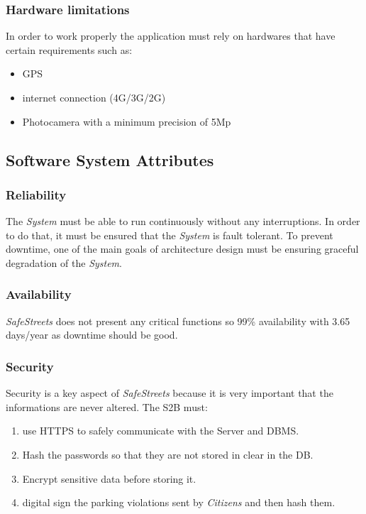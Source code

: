 \documentclass{article}
\begin{document}
\subsubsection{Hardware limitations}
In order to work properly the application must rely on hardwares that have certain requirements 
such as:
\begin{itemize}
    \item GPS
    \item internet connection (4G/3G/2G)
    \item Photocamera with a minimum precision of 5Mp 
\end{itemize}   

\subsection{Software System Attributes}

\subsubsection{Reliability}
The \textit{System} must be able to run continuously without any interruptions. In order to do that, it must be ensured 
that the \textit{System} is fault tolerant. To prevent downtime, one of the main goals of architecture design must be 
ensuring graceful degradation of the \textit{System}.

\subsubsection{Availability}
\textit{SafeStreets} does not present any critical functions so 99\% availability with 3.65 days/year
as downtime should be good.  

\subsubsection{Security}
Security is a key aspect of \textit{SafeStreets} because it is very important that the informations are never altered.
The S2B must:
\begin{enumerate}
 \item use HTTPS to safely communicate with the Server and DBMS.    
 \item Hash the passwords so that they are not stored in clear in the DB.
 \item Encrypt sensitive data before storing it.
 \item digital sign the parking violations sent by \textit{Citizens} and then hash them.  
\end{enumerate} 
\end{document}
